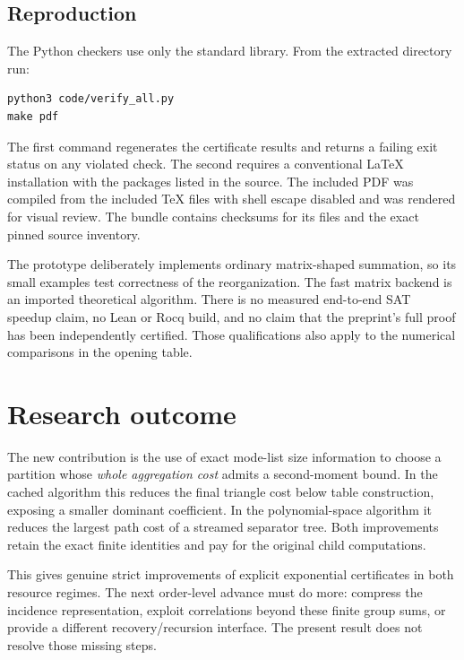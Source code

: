 \documentclass[11pt,letterpaper]{article}
\theoremstyle{remark}\newtheorem{remark}[theorem]{Remark}
\begin{document}
\subsection{Reproduction}

The Python checkers use only the standard library. From the extracted
directory run:
\begin{verbatim}
python3 code/verify_all.py
make pdf
\end{verbatim}
The first command regenerates the certificate results and returns a failing
exit status on any violated check. The second requires a conventional
LaTeX installation with the packages listed in the source. The included
PDF was compiled from the included TeX files with shell escape disabled
and was rendered for visual review. The bundle contains checksums for its
files and the exact pinned source inventory.

The prototype deliberately implements ordinary matrix-shaped summation,
so its small examples test correctness of the reorganization. The fast
matrix backend is an imported theoretical algorithm. There is no measured
end-to-end SAT speedup claim, no Lean or Rocq build, and no claim that the
preprint's full proof has been independently certified. Those qualifications
also apply to the numerical comparisons in the opening table.

\section{Research outcome}

The new contribution is the use of exact mode-list size information to
choose a partition whose \emph{whole aggregation cost} admits a second-moment
bound. In the cached algorithm this reduces the final triangle cost below
table construction, exposing a smaller dominant coefficient. In the
polynomial-space algorithm it reduces the largest path cost of a streamed
separator tree. Both improvements retain the exact finite identities and
pay for the original child computations.

This gives genuine strict improvements of explicit exponential certificates
in both resource regimes. The next order-level advance must do more:
compress the incidence representation, exploit correlations beyond these
finite group sums, or provide a different recovery/recursion interface.
The present result does not resolve those missing steps.
\end{document}
